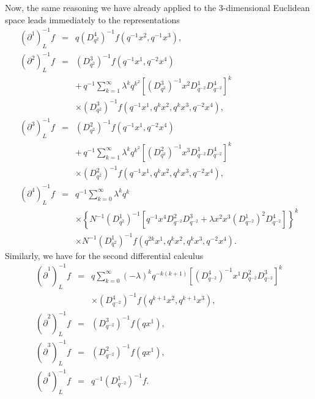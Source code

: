 \documentclass[a4paper,11pt,oneside]{article}
\begin{document}
Now, the same reasoning we have already applied to the 3-dimensional Euclidean
space leads immediately to the representations 
\begin{eqnarray}
\left( \partial ^{1}\right) _{L}^{-1}f &=&q\left( D_{q^{2}}^{4}\right)
^{-1}f\left( q^{-1}x^{2},q^{-1}x^{3}\right) , \\
\left( \partial ^{2}\right) _{L}^{-1}f &=&\left( D_{q^{2}}^{3}\right)
^{-1}f\left( q^{-1}x^{1},q^{-2}x^{4}\right)  \nonumber \\
&&+\,q^{-1}\sum_{k=1}^{\infty }\lambda ^{k}q^{k^{2}}\left[ \left(
D_{q^{2}}^{3}\right) ^{-1}x^{2}D_{q^{-2}}^{1}D_{q^{-2}}^{4}\right] ^{k} 
\nonumber \\
&&\times \left( D_{q^{2}}^{3}\right) ^{-1}f\left(
q^{-1}x^{1},q^{k}x^{2},q^{k}x^{3},q^{-2}x^{4}\right) ,  \nonumber \\
\left( \partial ^{3}\right) _{L}^{-1}f &=&\left( D_{q^{2}}^{2}\right)
^{-1}f\left( q^{-1}x^{1},q^{-2}x^{4}\right)  \nonumber \\
&&+\,q^{-1}\sum_{k=1}^{\infty }\lambda ^{k}q^{k^{2}}\left[ \left(
D_{q^{2}}^{2}\right) ^{-1}x^{3}D_{q^{-2}}^{1}D_{q^{-2}}^{4}\right] ^{k} 
\nonumber \\
&&\times \left( D_{q^{2}}^{2}\right) ^{-1}f\left(
q^{-1}x^{1},q^{k}x^{2},q^{k}x^{3},q^{-2}x^{4}\right) ,  \nonumber \\
\left( \partial ^{4}\right) _{L}^{-1}f &=&q^{-1}\sum_{k=0}^{\infty }\lambda
^{k}q^{k}  \nonumber \\
&&\times \left\{ N^{-1}\left( D_{q^{2}}^{1}\right) ^{-1}\left[
q^{-1}x^{4}D_{q^{-2}}^{2}D_{q^{-2}}^{3}+\lambda x^{2}x^{3}\left(
D_{q^{-2}}^{1}\right) ^{2}D_{q^{-2}}^{4}\right] \right\} ^{k}  \nonumber \\
&&\times N^{-1}\left( D_{q^{2}}^{1}\right) ^{-1}f\left(
q^{2k}x^{1},q^{k}x^{2},q^{k}x^{3},q^{-2}x^{4}\right) .  \nonumber
\end{eqnarray}
Similarly, we have for the second differential calculus 
\begin{eqnarray}
\left( \hat{\partial}^{1}\right) _{L}^{-1}f &=&q\sum_{k=0}^{\infty }\left(
-\lambda \right) ^{k}q^{-k\left( k+1\right) }\left[ \left(
D_{q^{-2}}^{4}\right) ^{-1}x^{1}D_{q^{-2}}^{2}D_{q^{-2}}^{3}\right] ^{k} \\
&&\times \left( D_{q^{-2}}^{4}\right) ^{-1}f\left(
q^{k+1}x^{2},q^{k+1}x^{3}\right) ,  \nonumber \\ 
\left( \hat{\partial}^{2}\right) _{L}^{-1}f &=&\left( D_{q^{-2}}^{3}\right)
^{-1}f\left( qx^{1}\right) ,  \nonumber \\
\left( \hat{\partial}^{3}\right) _{L}^{-1}f &=&\left( D_{q^{-2}}^{2}\right)
^{-1}f\left( qx^{1}\right) ,  \nonumber \\
\left( \hat{\partial}^{4}\right) _{L}^{-1}f &=&q^{-1}\left(
D_{q^{-2}}^{1}\right) ^{-1}f.  \nonumber
\end{eqnarray}
\end{document}
